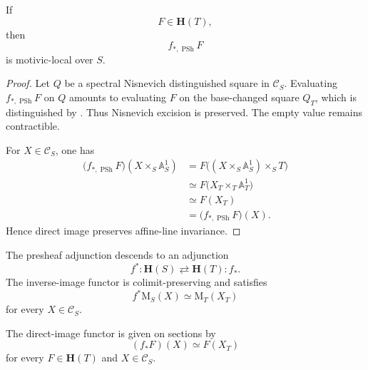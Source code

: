 \begin{proposition}
\label{prop:direct-image-preserves-motivic-local}
If
\[
    F
    \in
    \mathbf H(T),
\]
then
\[
    f_{*,\operatorname{PSh}}F
\]
is motivic-local over \(S\).
\end{proposition}

\begin{proof}
Let \(Q\) be a spectral Nisnevich distinguished square in
\(\mathcal C_S\).  Evaluating \(f_{*,\operatorname{PSh}}F\) on \(Q\)
amounts to evaluating \(F\) on the base-changed square \(Q_T\), which is
distinguished by
.
Thus Nisnevich excision is preserved.  The empty value remains
contractible.

For \(X\in\mathcal C_S\), one has
\[
\begin{aligned}
    \bigl(
        f_{*,\operatorname{PSh}}F
    \bigr)
    (X\times_S\mathbb A^1_S)
    &=
    F
    \bigl(
        (X\times_S\mathbb A^1_S)\times_ST
    \bigr)
    \\
    &\simeq
    F
    \bigl(
        X_T\times_T\mathbb A^1_T
    \bigr)
    \\
    &\simeq
    F(X_T)
    \\
    &=
    \bigl(
        f_{*,\operatorname{PSh}}F
    \bigr)(X).
\end{aligned}
\]
Hence direct image preserves affine-line invariance.
\end{proof}

\begin{theorem}
\label{thm:motivic-inverse-direct-image}
The presheaf adjunction descends to an adjunction
\[
    f^*
    \colon
    \mathbf H(S)
    \rightleftarrows
    \mathbf H(T)
    :
    f_*.
\]
The inverse-image functor is colimit-preserving and satisfies
\[
    f^*\mathrm M_S(X)
    \simeq
    \mathrm M_T(X_T)
\]
for every \(X\in\mathcal C_S\).

The direct-image functor is given on sections by
\[
    (f_*F)(X)
    \simeq
    F(X_T)
\]
for every \(F\in\mathbf H(T)\) and \(X\in\mathcal C_S\).
\end{theorem}

